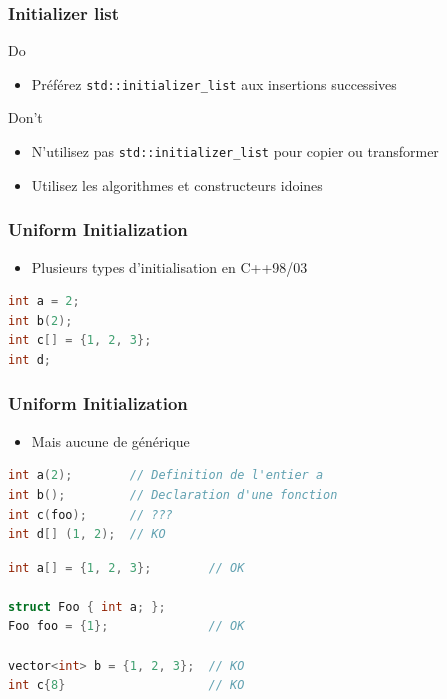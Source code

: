 \documentclass[C++.tex]{subfiles}
\begin{document}
\begin{frame}[fragile]
\frametitle{Initializer list}
	\begin{exampleblock}{Do}
		\begin{itemize}
			\item Préférez \lstinline|std::initializer_list| aux insertions successives
		\end{itemize}
	\end{exampleblock}

	\pause

	\begin{alertblock}{Don't}
		\begin{itemize}
			\item N'utilisez pas \lstinline|std::initializer_list| pour copier ou transformer
			\item Utilisez les algorithmes et constructeurs idoines
		\end{itemize}

	\end{alertblock}
\end{frame}

\begin{frame}[fragile]
	\frametitle{Uniform Initialization}
	\begin{itemize}
		\item Plusieurs types d'initialisation en C++98/03
	\end{itemize}

	\begin{lstlisting}[language=C++]
int a = 2;
int b(2);
int c[] = {1, 2, 3};
int d;\end{lstlisting}
\end{frame}

\begin{frame}[fragile]
	\frametitle{Uniform Initialization}
	\begin{itemize}
		\item Mais aucune de générique
	\end{itemize}

	\begin{lstlisting}[language=C++]
int a(2);        // Definition de l'entier a
int b();         // Declaration d'une fonction
int c(foo);      // ???
int d[] (1, 2);  // KO\end{lstlisting}


	\pause

	\begin{lstlisting}[language=C++]
int a[] = {1, 2, 3};        // OK

struct Foo { int a; };
Foo foo = {1};              // OK

vector<int> b = {1, 2, 3};  // KO
int c{8}                    // KO\end{lstlisting}

\end{frame}
\end{document}
